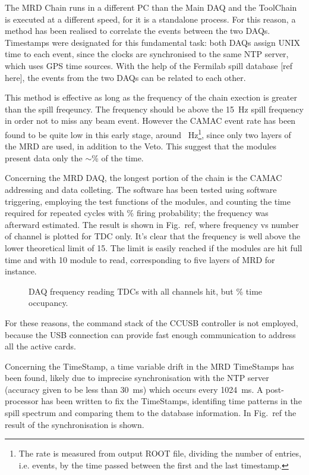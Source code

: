 The MRD Chain runs in a different PC than the Main DAQ and the ToolChain %
is executed at a different speed, for it is a standalone process.
For this reason, a method has been realised to correlate the events between the two DAQs.
Timestamps were designated for this fundamental task: both DAQs assign UNIX time to each event, since %
the clocks are synchronised to the same NTP server, which uses GPS time sources.
With the help of the Fermilab spill database [ref here], the events from the two DAQs can be related %
to each other.

This method is effective as long as the frequency of the chain exection is greater than the %
spill freqeuncy.
The frequency should be above the 15~Hz spill frequency in order not to miss any beam event.
However the CAMAC event rate has been found to be quite low in this %
early stage, around ~Hz\footnote{The rate is measured from output ROOT file, dividing %
  the number of entries, i.e. events, by the time passed between the first and the last timestamp.}, %
since only two layers of the MRD are used, in addition to the Veto.
This suggest that the modules present data only the $\sim$\% of the time.

Concerning the MRD DAQ, the longest portion of the chain is the CAMAC addressing and data colleting.
The software has been tested using software triggering, employing the test functions of the modules, %
and counting the time required for  repeated cycles with \% firing probability; %
the frequency was afterward estimated.
The result is shown in Fig.~ref, where frequency vs number of channel is plotted for TDC only.
It's clear that the frequency is well above the lower theoretical limit of 15.
The limit is easily reached if the modules are hit full time and with 10 module to read, %
corresponding to five layers of MRD for instance.

\begin{figure}
  \centering
    
    \caption{DAQ frequency reading TDCs with all channels hit, but \% time occupancy.}
  \label{fig:tdcfreq}
\end{figure}



For these reasons, the command stack of the CCUSB controller is not employed, %
because the USB connection can provide fast enough communication to address all the active cards.

Concerning the TimeStamp, a time variable drift in the MRD TimeStamps has been found, %
likely due to imprecise synchronisation with the NTP server %
(accuracy given to be less than 30~ms) which occurs every 1024~ms. 
A post-processor has been written to fix the TimeStamps, identifing time patterns in the %
spill spectrum and comparing them to the database information.
In Fig.~ref the result of the synchronisation is shown.

